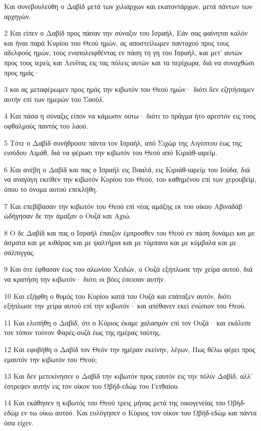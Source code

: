 \par Και συνεβουλεύθη ο Δαβίδ μετά των χιλιάρχων και εκατοντάρχων, μετά πάντων των αρχηγών.
\par 2 Και είπεν ο Δαβίδ προς πάσαν την σύναξιν του Ισραήλ, Εάν σας φαίνηται καλόν και ήναι παρά Κυρίου του Θεού ημών, ας αποστείλωμεν πανταχού προς τους αδελφούς ημών, τους εναπολειφθέντας εν πάση τη γη του Ισραήλ, και μετ' αυτών προς τους ιερείς και Λευΐτας εις τας πόλεις αυτών και τα περίχωρα, διά να συναχθώσι προς ημάς·
\par 3 και ας μεταφέρωμεν προς ημάς την κιβωτόν του Θεού ημών· διότι δεν εζητήσαμεν αυτήν επί των ημερών του Σαούλ.
\par 4 Και πάσα η σύναξις είπον να κάμωσιν ούτω· διότι το πράγμα ήτο αρεστόν εις τους οφθαλμούς παντός του λαού.
\par 5 Τότε ο Δαβίδ συνήθροισε πάντα τον Ισραήλ, από Σιχώρ της Αιγύπτου έως της εισόδου Αιμάθ, διά να φέρωσι την κιβωτόν του Θεού από Κιριάθ-ιαρείμ.
\par 6 Και ανέβη ο Δαβίδ και πας ο Ισραήλ εις Βααλά, εις Κιριάθ-ιαρείμ του Ιούδα, διά να αναγάγη εκείθεν την κιβωτόν Κυρίου του Θεού, του καθημένου επί των χερουβείμ, όπου το όνομα αυτού επεκλήθη.
\par 7 Και επεβίβασαν την κιβωτόν του Θεού επί νέας αμάξης εκ του οίκου Αβιναδάβ· ώδήγησαν δε την άμαξαν ο Ουζά και Αχιώ.
\par 8 Ο δε Δαβίδ και πας ο Ισραήλ έπαιζον έμπροσθεν του Θεού εν πάση δυνάμει και με άσματα και με κιθάρας και με ψαλτήρια και με τύμπανα και με κύμβαλα και με σάλπιγγας.
\par 9 Και ότε έφθασαν έως του αλωνίου Χειδών, ο Ουζά εξήπλωσε την χείρα αυτού, διά να κρατήση την κιβωτόν· διότι οι βόες έσεισαν αυτήν.
\par 10 Και εξήφθη ο θυμός του Κυρίου κατά του Ουζά και επάταξεν αυτόν, διότι εξήπλωσε την χείρα αυτού επί την κιβωτόν· και απέθανεν εκεί ενώπιον του Θεού.
\par 11 Και ελυπήθη ο Δαβίδ, ότι ο Κύριος έκαμε χαλασμόν επί τον Ουζά· και εκάλεσε τον τόπον τούτον Φαρές-ουζά έως της ημέρας ταύτης.
\par 12 Και εφοβήθη ο Δαβίδ τον Θεόν την ημέραν εκείνην, λέγων, Πως θέλω φέρει προς εμαυτόν την κιβωτόν του Θεού;
\par 13 Και δεν μετεκίνησεν ο Δαβίδ την κιβωτόν προς εαυτόν εις την πόλιν Δαβίδ, αλλ' έστρεψεν αυτήν εις τον οίκον του Ωβήδ-εδώμ του Γετθαίου.
\par 14 Και εκάθησεν η κιβωτός του Θεού τρεις μήνας μετά της οικογενείας του Ωβήδ-εδώμ εν τω οίκω αυτού. Και ευλόγησεν ο Κύριος τον οίκον του Ωβήδ-εδώμ και πάντα όσα είχεν.

